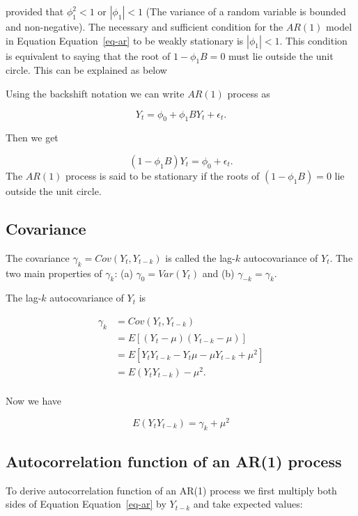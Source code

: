 \documentclass[
  11pt,
  a4paper,
]{report}
\begin{document}
provided that \(\phi_1^2 < 1\) or \(|\phi_1| < 1\) (The variance of a
random variable is bounded and non-negative). The necessary and
sufficient condition for the \(AR(1)\) model in Equation
Equation~\ref{eq-ar} to be weakly stationary is \(|\phi_1| < 1\). This
condition is equivalent to saying that the root of \(1-\phi_1B = 0\)
must lie outside the unit circle. This can be explained as below

Using the backshift notation we can write \(AR(1)\) process as

\[Y_t = \phi_0 + \phi_1BY_{t} + \epsilon_t.\]

Then we get

\[(1-\phi_1B)Y_t=\phi_0 + \epsilon_t.\] The \(AR(1)\) process is said to
be stationary if the roots of \((1-\phi_1B)=0\) lie outside the unit
circle.

\subsection{Covariance}\label{covariance}

The covariance \(\gamma_k=Cov(Y_t, Y_{t-k})\) is called the lag-\(k\)
autocovariance of \(Y_t\). The two main properties of \(\gamma_k\): (a)
\(\gamma_0=Var(Y_t)\) and (b) \(\gamma_{-k}=\gamma_{k}\).

The lag-\(k\) autocovariance of \(Y_t\) is

\begin{equation}
\begin{aligned}
  \gamma_k &= Cov(Y_t, Y_{t-k}) \\
         &= E[(Y_t-\mu)(Y_{t-k}-\mu)] \\
         &= E[Y_tY_{t-k}-Y_t\mu-\mu Y_{t-k} +\mu^2] \\
         &= E(Y_t Y_{t-k}) - \mu^2. \\
\end{aligned}
\end{equation}

Now we have

\begin{equation}
  E(Y_t Y_{t-k}) = \gamma_k + \mu^2
\end{equation}

\subsection{Autocorrelation function of an AR(1)
process}\label{autocorrelation-function-of-an-ar1-process}

To derive autocorrelation function of an AR(1) process we first multiply
both sides of Equation Equation~\ref{eq-ar} by \(Y_{t-k}\) and take
expected values:
\end{document}
